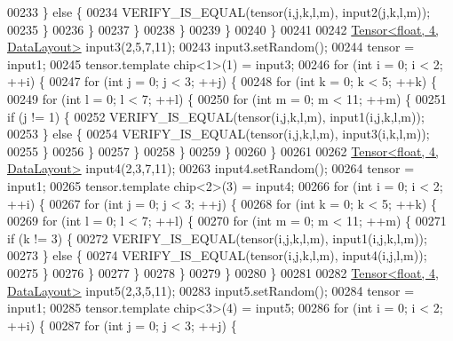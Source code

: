 \begin{DoxyCode}
00233             \} \textcolor{keywordflow}{else} \{
00234               VERIFY\_IS\_EQUAL(tensor(i,j,k,l,m), input2(j,k,l,m));
00235             \}
00236           \}
00237         \}
00238       \}
00239     \}
00240   \}
00241 
00242   \hyperlink{class_eigen_1_1_tensor}{Tensor<float, 4, DataLayout>} input3(2,5,7,11);
00243   input3.setRandom();
00244   tensor = input1;
00245   tensor.template chip<1>(1) = input3;
00246   \textcolor{keywordflow}{for} (\textcolor{keywordtype}{int} i = 0; i < 2; ++i) \{
00247     \textcolor{keywordflow}{for} (\textcolor{keywordtype}{int} j = 0; j < 3; ++j) \{
00248       \textcolor{keywordflow}{for} (\textcolor{keywordtype}{int} k = 0; k < 5; ++k) \{
00249         \textcolor{keywordflow}{for} (\textcolor{keywordtype}{int} l = 0; l < 7; ++l) \{
00250           \textcolor{keywordflow}{for} (\textcolor{keywordtype}{int} m = 0; m < 11; ++m) \{
00251             \textcolor{keywordflow}{if} (j != 1) \{
00252               VERIFY\_IS\_EQUAL(tensor(i,j,k,l,m), input1(i,j,k,l,m));
00253             \} \textcolor{keywordflow}{else} \{
00254               VERIFY\_IS\_EQUAL(tensor(i,j,k,l,m), input3(i,k,l,m));
00255             \}
00256           \}
00257         \}
00258       \}
00259     \}
00260   \}
00261 
00262   \hyperlink{class_eigen_1_1_tensor}{Tensor<float, 4, DataLayout>} input4(2,3,7,11);
00263   input4.setRandom();
00264   tensor = input1;
00265   tensor.template chip<2>(3) = input4;
00266   \textcolor{keywordflow}{for} (\textcolor{keywordtype}{int} i = 0; i < 2; ++i) \{
00267     \textcolor{keywordflow}{for} (\textcolor{keywordtype}{int} j = 0; j < 3; ++j) \{
00268       \textcolor{keywordflow}{for} (\textcolor{keywordtype}{int} k = 0; k < 5; ++k) \{
00269         \textcolor{keywordflow}{for} (\textcolor{keywordtype}{int} l = 0; l < 7; ++l) \{
00270           \textcolor{keywordflow}{for} (\textcolor{keywordtype}{int} m = 0; m < 11; ++m) \{
00271             \textcolor{keywordflow}{if} (k != 3) \{
00272               VERIFY\_IS\_EQUAL(tensor(i,j,k,l,m), input1(i,j,k,l,m));
00273             \} \textcolor{keywordflow}{else} \{
00274               VERIFY\_IS\_EQUAL(tensor(i,j,k,l,m), input4(i,j,l,m));
00275             \}
00276           \}
00277         \}
00278       \}
00279     \}
00280   \}
00281 
00282   \hyperlink{class_eigen_1_1_tensor}{Tensor<float, 4, DataLayout>} input5(2,3,5,11);
00283   input5.setRandom();
00284   tensor = input1;
00285   tensor.template chip<3>(4) = input5;
00286   \textcolor{keywordflow}{for} (\textcolor{keywordtype}{int} i = 0; i < 2; ++i) \{
00287     \textcolor{keywordflow}{for} (\textcolor{keywordtype}{int} j = 0; j < 3; ++j) \{

\end{DoxyCode}
